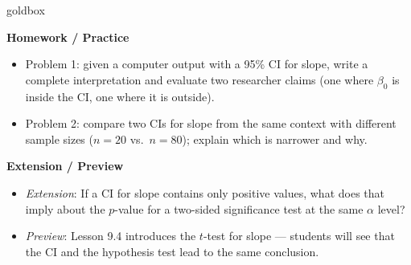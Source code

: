 \documentclass[10pt]{article}
\begin{document}
\begin{skillbox}{goldbox}
\begin{minipage}[t]{0.48\linewidth}
    \textbf{Homework / Practice}
    \begin{itemize}
        \item Problem 1: given a computer output with a 95\% CI for slope, write a complete
              interpretation and evaluate two researcher claims (one where $\beta_0$ is inside
              the CI, one where it is outside).
        \item Problem 2: compare two CIs for slope from the same context with different sample
              sizes ($n = 20$ vs.\ $n = 80$); explain which is narrower and why.
    \end{itemize}
\end{minipage}
\hfill
\begin{minipage}[t]{0.48\linewidth}
    \textbf{Extension / Preview}
    \begin{itemize}
        \item \textit{Extension}: If a CI for slope contains only positive values, what does
              that imply about the $p$-value for a two-sided significance test at the same
              $\alpha$ level?
        \item \textit{Preview}: Lesson 9.4 introduces the $t$-test for slope --- students
              will see that the CI and the hypothesis test lead to the same conclusion.
    \end{itemize}
\end{minipage}
\end{skillbox}
\end{document}
